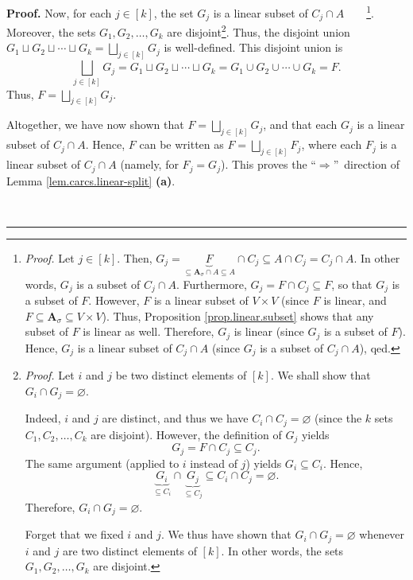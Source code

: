\documentclass[numbers=enddot,12pt,final,onecolumn,notitlepage]{scrartcl}%
\numberwithin{exer}{section}
\theoremstyle{definition}
\newenvironment{proof}[1][Proof]{\noindent\textbf{#1.} }{\ \rule{0.5em}{0.5em}}
\let\sqcupnonlimits\bigsqcup
\renewcommand{\bigsqcup}{\sqcupnonlimits\limits}
\newenvironment{verlong}{}{}
\begin{document}
\begin{verlong}
\begin{proof}
Now, for each $j\in\left[  k\right]  $, the set $G_{j}$ is a linear subset of
$C_{j}\cap A$\ \ \ \ \footnote{\textit{Proof.} Let $j\in\left[  k\right]  $.
Then, $G_{j}=\underbrace{F}_{\subseteq\mathbf{A}_{\sigma}\cap A\subseteq
A}\cap C_{j}\subseteq A\cap C_{j}=C_{j}\cap A$. In other words, $G_{j}$ is a
subset of $C_{j}\cap A$. Furthermore, $G_{j}=F\cap C_{j}\subseteq F$, so that
$G_{j}$ is a subset of $F$. However, $F$ is a linear subset of $V\times V$
(since $F$ is linear, and $F\subseteq\mathbf{A}_{\sigma}\subseteq V\times V$).
Thus, Proposition \ref{prop.linear.subset} shows that any subset of $F$ is
linear as well. Therefore, $G_{j}$ is linear (since $G_{j}$ is a subset of
$F$). Hence, $G_{j}$ is a linear subset of $C_{j}\cap A$ (since $G_{j}$ is a
subset of $C_{j}\cap A$), qed.}. Moreover, the sets $G_{1},G_{2},\ldots,G_{k}$
are disjoint\footnote{\textit{Proof.} Let $i$ and $j$ be two distinct elements
of $\left[  k\right]  $. We shall show that $G_{i}\cap G_{j}=\varnothing$.
\par
Indeed, $i$ and $j$ are distinct, and thus we have $C_{i}\cap C_{j}%
=\varnothing$ (since the $k$ sets $C_{1},C_{2},\ldots,C_{k}$ are disjoint).
However, the definition of $G_{j}$ yields
\[
G_{j}=F\cap C_{j}\subseteq C_{j}.
\]
The same argument (applied to $i$ instead of $j$) yields $G_{i}\subseteq
C_{i}$. Hence,%
\[
\underbrace{G_{i}}_{\subseteq C_{i}}\cap\underbrace{G_{j}}_{\subseteq C_{j}%
}\subseteq C_{i}\cap C_{j}=\varnothing.
\]
Therefore, $G_{i}\cap G_{j}=\varnothing$.
\par
Forget that we fixed $i$ and $j$. We thus have shown that $G_{i}\cap
G_{j}=\varnothing$ whenever $i$ and $j$ are two distinct elements of $\left[
k\right]  $. In other words, the sets $G_{1},G_{2},\ldots,G_{k}$ are
disjoint.}. Thus, the disjoint union $G_{1}\sqcup G_{2}\sqcup\cdots\sqcup
G_{k}=\bigsqcup_{j\in\left[  k\right]  }G_{j}$ is well-defined. This disjoint
union is%
\[
\bigsqcup_{j\in\left[  k\right]  }G_{j}=G_{1}\sqcup G_{2}\sqcup\cdots\sqcup
G_{k}=G_{1}\cup G_{2}\cup\cdots\cup G_{k}=F.
\]
Thus, $F=\bigsqcup_{j\in\left[  k\right]  }G_{j}$.

Altogether, we have now shown that $F=\bigsqcup_{j\in\left[  k\right]  }G_{j}%
$, and that each $G_{j}$ is a linear subset of $C_{j}\cap A$. Hence, $F$ can
be written as $F=\bigsqcup_{j\in\left[  k\right]  }F_{j}$, where each $F_{j}$
is a linear subset of $C_{j}\cap A$ (namely, for $F_{j}=G_{j}$). This proves
the \textquotedblleft$\Longrightarrow$\textquotedblright\ direction of Lemma
\ref{lem.carcs.linear-split} \textbf{(a)}. \medskip


\end{proof}
\end{verlong}
\end{document}

